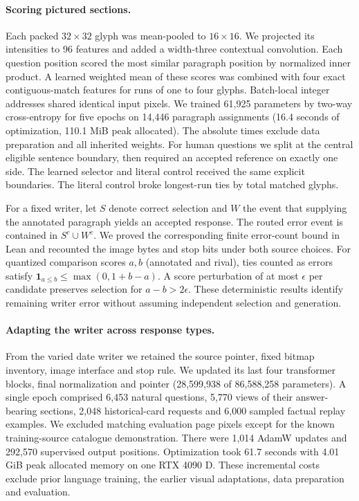 \documentclass[12pt,a4paper]{article}
\providecommand{\DIFadd}[1]{{\protect\color{blue} \sf #1}} %
\begin{document}
\paragraph{\DIFadd{Scoring pictured sections.}}
\DIFadd{Each packed $32\times32$ glyph was mean-pooled to $16\times16$. We projected its intensities to 96 features and added a width-three contextual convolution. Each question position scored the most similar paragraph position by normalized inner product. A learned weighted mean of these scores was combined with four exact contiguous-match features for runs of one to four glyphs. Batch-local integer addresses shared identical input pixels. We trained 61,925 parameters by two-way cross-entropy for five epochs on 14,446 paragraph assignments (16.4 seconds of optimization, 110.1 MiB peak allocated). The absolute times exclude data preparation and all inherited weights. For human questions we split at the central eligible sentence boundary, then required an accepted reference on exactly one side. The learned selector and literal control received the same explicit boundaries. The literal control broke longest-run ties by total matched glyphs.
}

\DIFadd{For a fixed writer, let $S$ denote correct selection and $W$ the event that supplying the annotated paragraph yields an accepted response. The routed error event is contained in $S^c\cup W^c$. We proved the corresponding finite error-count bound in Lean and recounted the image bytes and stop bits under both source choices. For quantized comparison scores $a,b$ (annotated and rival), ties counted as errors satisfy $\mathbf{1}_{a\leq b}\leq\max(0,1+b-a)$. A score perturbation of at most $\epsilon$ per candidate preserves selection for $a-b>2\epsilon$. These deterministic results identify remaining writer error without assuming independent selection and generation.
}

\paragraph{\DIFadd{Adapting the writer across response types.}}
\DIFadd{From the varied date writer we retained the source pointer, fixed bitmap inventory, image interface and stop rule. We updated its last four transformer blocks, final normalization and pointer (28,599,938 of 86,588,258 parameters). A single epoch comprised 6,453 natural questions, 5,770 views of their answer-bearing sections, 2,048 historical-card requests and 6,000 sampled factual replay examples. We excluded matching evaluation page pixels except for the known training-source catalogue demonstration. There were 1,014 AdamW updates and 292,570 supervised output positions. Optimization took 61.7 seconds with 4.01 GiB peak allocated memory on one RTX 4090 D. These incremental costs exclude prior language training, the earlier visual adaptations, data preparation and evaluation.
}
\end{document}
